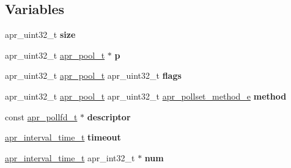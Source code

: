\subsection*{Variables}
\begin{DoxyCompactItemize}
\item 
\mbox{\label{group__apr__poll_ga7da682250c23eaa2193d58188e2cf96c}} 
apr\+\_\+uint32\+\_\+t {\bfseries size}
\item 
\mbox{\label{group__apr__poll_ga28e6897534e326f77e900eb1453b4fea}} 
apr\+\_\+uint32\+\_\+t \mbox{\hyperlink{group__apr__pools_gaf137f28edcf9a086cd6bc36c20d7cdfb}{apr\+\_\+pool\+\_\+t}} $\ast$ {\bfseries p}
\item 
\mbox{\label{group__apr__poll_gaf8cd8dfff060e0cd10e32063eef7d30c}} 
apr\+\_\+uint32\+\_\+t \mbox{\hyperlink{group__apr__pools_gaf137f28edcf9a086cd6bc36c20d7cdfb}{apr\+\_\+pool\+\_\+t}} apr\+\_\+uint32\+\_\+t {\bfseries flags}
\item 
\mbox{\label{group__apr__poll_ga6c1b16298acdfc2ca3cba871da0daa17}} 
apr\+\_\+uint32\+\_\+t \mbox{\hyperlink{group__apr__pools_gaf137f28edcf9a086cd6bc36c20d7cdfb}{apr\+\_\+pool\+\_\+t}} apr\+\_\+uint32\+\_\+t \mbox{\hyperlink{group__apr__poll_gabe6f1238ea45e9425fa052e2788e4a29}{apr\+\_\+pollset\+\_\+method\+\_\+e}} {\bfseries method}
\item 
\mbox{\label{group__apr__poll_ga93f9312d40401caaec1865013fe2bf61}} 
const \mbox{\hyperlink{structapr__pollfd__t}{apr\+\_\+pollfd\+\_\+t}} $\ast$ {\bfseries descriptor}
\item 
\mbox{\label{group__apr__poll_ga9ceb71d3d9fcd18962d16e49bef6153a}} 
\mbox{\hyperlink{group__apr__time_gaae2129185a395cc393f76fabf4f43e47}{apr\+\_\+interval\+\_\+time\+\_\+t}} {\bfseries timeout}
\item 
\mbox{\label{group__apr__poll_ga8c10598f743ada9822ab203974a58304}} 
\mbox{\hyperlink{group__apr__time_gaae2129185a395cc393f76fabf4f43e47}{apr\+\_\+interval\+\_\+time\+\_\+t}} apr\+\_\+int32\+\_\+t $\ast$ {\bfseries num}
\item 
\mbox{\label{group__apr__poll_ga79b31f5f6b249ca41dcc8a49b8fd5aa9}} 

\end{DoxyCompactItemize}
